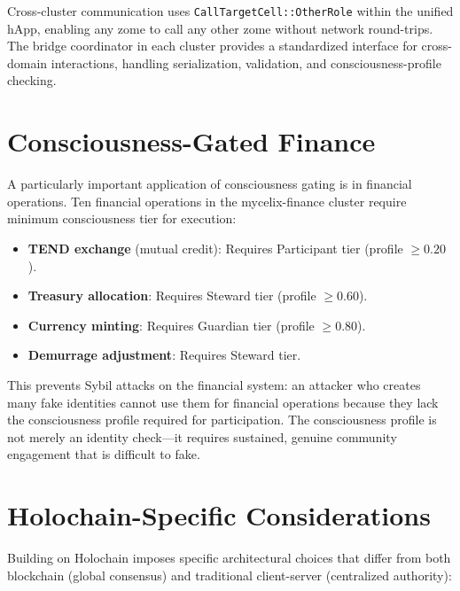 \documentclass[12pt]{book}
\begin{document}
Cross-cluster communication uses \texttt{CallTargetCell::OtherRole} within the unified hApp, enabling any zome to call any other zome without network round-trips. The bridge coordinator in each cluster provides a standardized interface for cross-domain interactions, handling serialization, validation, and consciousness-profile checking.

\section{Consciousness-Gated Finance}

A particularly important application of consciousness gating is in financial operations. Ten financial operations in the mycelix-finance cluster require minimum consciousness tier for execution:

\begin{itemize}
  \item \textbf{TEND exchange} (mutual credit): Requires Participant tier (profile $\geq 0.20$).
  \item \textbf{Treasury allocation}: Requires Steward tier (profile $\geq 0.60$).
  \item \textbf{Currency minting}: Requires Guardian tier (profile $\geq 0.80$).
  \item \textbf{Demurrage adjustment}: Requires Steward tier.
\end{itemize}

This prevents Sybil attacks on the financial system: an attacker who creates many fake identities cannot use them for financial operations because they lack the consciousness profile required for participation. The consciousness profile is not merely an identity check---it requires sustained, genuine community engagement that is difficult to fake.

\section{Holochain-Specific Considerations}

Building on Holochain imposes specific architectural choices that differ from both blockchain (global consensus) and traditional client-server (centralized authority):
\end{document}
